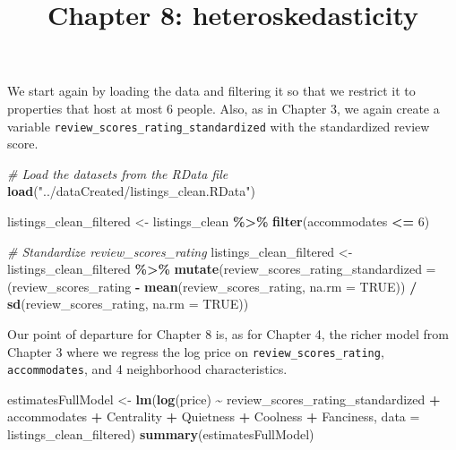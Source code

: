 \documentclass[
]{article}
\title{Chapter 8: heteroskedasticity}
\author{}
\date{\vspace{-2.5em}}
\newenvironment{Shaded}{\begin{snugshade}}{\end{snugshade}}
\newcommand{\AttributeTok}[1]{\textcolor[rgb]{0.13,0.29,0.53}{#1}}
\newcommand{\CommentTok}[1]{\textcolor[rgb]{0.56,0.35,0.01}{\textit{#1}}}
\newcommand{\ConstantTok}[1]{\textcolor[rgb]{0.56,0.35,0.01}{#1}}
\newcommand{\DecValTok}[1]{\textcolor[rgb]{0.00,0.00,0.81}{#1}}
\newcommand{\FunctionTok}[1]{\textcolor[rgb]{0.13,0.29,0.53}{\textbf{#1}}}
\newcommand{\NormalTok}[1]{#1}
\newcommand{\OtherTok}[1]{\textcolor[rgb]{0.56,0.35,0.01}{#1}}
\newcommand{\SpecialCharTok}[1]{\textcolor[rgb]{0.81,0.36,0.00}{\textbf{#1}}}
\newcommand{\StringTok}[1]{\textcolor[rgb]{0.31,0.60,0.02}{#1}}
\begin{document}
\maketitle

We start again by loading the data and filtering it so that we restrict
it to properties that host at most 6 people. Also, as in Chapter 3, we
again create a variable \texttt{review\_scores\_rating\_standardized}
with the standardized review score.

\begin{Shaded}
\begin{Highlighting}[]
\CommentTok{\# Load the datasets from the RData file}
\FunctionTok{load}\NormalTok{(}\StringTok{"../dataCreated/listings\_clean.RData"}\NormalTok{)}

\NormalTok{listings\_clean\_filtered }\OtherTok{\textless{}{-}}\NormalTok{ listings\_clean }\SpecialCharTok{\%\textgreater{}\%}
  \FunctionTok{filter}\NormalTok{(accommodates }\SpecialCharTok{\textless{}=} \DecValTok{6}\NormalTok{) }

\CommentTok{\# Standardize review\_scores\_rating}
\NormalTok{listings\_clean\_filtered }\OtherTok{\textless{}{-}}\NormalTok{ listings\_clean\_filtered }\SpecialCharTok{\%\textgreater{}\%}
  \FunctionTok{mutate}\NormalTok{(}\AttributeTok{review\_scores\_rating\_standardized =} 
\NormalTok{           (review\_scores\_rating }\SpecialCharTok{{-}} \FunctionTok{mean}\NormalTok{(review\_scores\_rating, }\AttributeTok{na.rm =} \ConstantTok{TRUE}\NormalTok{)) }\SpecialCharTok{/} 
           \FunctionTok{sd}\NormalTok{(review\_scores\_rating, }\AttributeTok{na.rm =} \ConstantTok{TRUE}\NormalTok{))}
\end{Highlighting}
\end{Shaded}

Our point of departure for Chapter 8 is, as for Chapter 4, the richer
model from Chapter 3 where we regress the log price on
\texttt{review\_scores\_rating}, \texttt{accommodates}, and 4
neighborhood characteristics.

\begin{Shaded}
\begin{Highlighting}[]
\NormalTok{estimatesFullModel }\OtherTok{\textless{}{-}} \FunctionTok{lm}\NormalTok{(}\FunctionTok{log}\NormalTok{(price) }\SpecialCharTok{\textasciitilde{}}\NormalTok{ review\_scores\_rating\_standardized }\SpecialCharTok{+}\NormalTok{ accommodates }\SpecialCharTok{+}\NormalTok{ Centrality }\SpecialCharTok{+}\NormalTok{ Quietness }\SpecialCharTok{+}\NormalTok{ Coolness }\SpecialCharTok{+}\NormalTok{ Fanciness, }\AttributeTok{data =}\NormalTok{ listings\_clean\_filtered)}
\FunctionTok{summary}\NormalTok{(estimatesFullModel)}
\end{Highlighting}
\end{Shaded}
\end{document}
